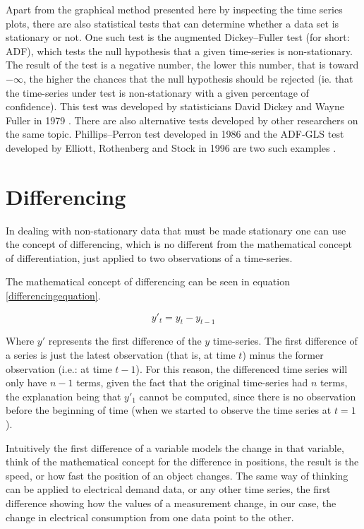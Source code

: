 \documentclass[12pt,a4paper,titlepage]{report}
\begin{document}
Apart from the graphical method presented here by inspecting the time series plots, there are also statistical tests that can determine whether a data set is stationary or not. One such test is the augmented Dickey–Fuller test (for short: ADF), which tests the null hypothesis that a given time-series is non-stationary. The result of the test is a negative number, the lower this number, that is toward $ - \infty $, the higher the chances that the null hypothesis should be rejected (ie. that the time-series under test is non-stationary with a given percentage of confidence). This test was developed by statisticians David Dickey and Wayne Fuller in 1979 \cite{adftest}. There are also alternative tests developed by other researchers on the same topic. Phillips–Perron test developed in 1986 \cite{unitroottestsPhillips} and the ADF-GLS test developed by Elliott, Rothenberg and Stock in 1996 are two such examples \cite{unitroottestselliott}.

\section{Differencing} \label{differencing}

In dealing with non-stationary data that must be made stationary one can use the concept of differencing, which is no different from the mathematical concept of differentiation, just applied to two observations of a time-series. \cite{boxjenkins}

The mathematical concept of differencing can be seen in equation \ref{differencingequation}.

\begin{equation}
y'_{t} = y_{t} - y_{t-1}
\label{differencingequation}
\end{equation}

Where $ y' $ represents the first difference of the $ y $ time-series. The first difference of a series is just the latest observation (that is, at time $ t $) minus the former observation (i.e.: at time $ t-1 $). For this reason, the differenced time series will only have $ n - 1 $ terms, given the fact that the original time-series had $ n $ terms, the explanation being that $ y'_{1} $ cannot be computed, since there is no observation before the beginning of time (when we started to observe the time series at $ t = 1 $). 

Intuitively the first difference of a variable models the change in that variable, think of the mathematical concept for the difference in positions, the result is the speed, or how fast the position of an object changes. The same way of thinking can be applied to electrical demand data, or any other time series, the first difference showing how the values of a measurement change, in our case, the change in electrical consumption from one data point to the other.
\end{document}
